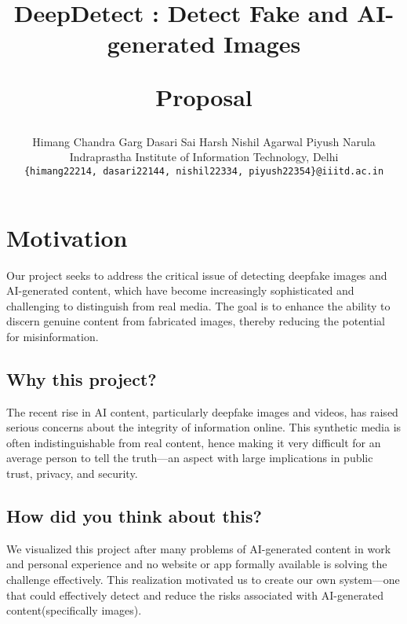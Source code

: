 \documentclass[10pt,twocolumn,letterpaper]{article}
\begin{document}
\title{\begin{center}
    DeepDetect : Detect Fake and AI-generated Images
\end{center}
Proposal}

\author{Himang Chandra Garg \qquad Dasari Sai Harsh \qquad Nishil Agarwal \qquad Piyush Narula\\
Indraprastha Institute of Information Technology, Delhi\\
{\tt\small \{himang22214, dasari22144, nishil22334, piyush22354\}@iiitd.ac.in}
}

\maketitle

\pagestyle{empty}

\section{Motivation}

Our project seeks to address the critical issue of detecting deepfake images and AI-generated content, which have become increasingly sophisticated and challenging to distinguish from real media. 
The goal is to enhance the ability to discern genuine content from fabricated images, thereby reducing the potential for misinformation.

\subsection{Why this project?}

The recent rise in AI content, particularly deepfake images and videos, has raised serious concerns about the integrity of information online. 
This synthetic media is often indistinguishable from real content, hence making it very difficult for an average person to tell the truth—an aspect with large implications in public trust, privacy, and security.

\subsection{How did you think about this?}

We visualized this project after many problems of AI-generated content in work and personal experience and no website or app formally available is solving the challenge effectively. 
This realization motivated us to create our own system—one that could effectively detect and reduce the risks associated with AI-generated content(specifically images).
\end{document}
